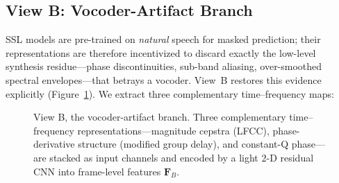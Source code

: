 \subsection{View B: Vocoder-Artifact Branch}
\label{ssec:viewb}

SSL models are pre-trained on \emph{natural} speech for masked prediction; their
representations are therefore incentivized to discard exactly the low-level synthesis
residue---phase discontinuities, sub-band aliasing, over-smoothed spectral
envelopes---that betrays a vocoder. View~B restores this evidence explicitly
(Figure~\ref{fig:artifact}). We extract three complementary time--frequency maps:

\begin{figure}[t]
\centering
{}
\caption{View B, the vocoder-artifact branch. Three complementary time--frequency
representations---magnitude cepstra (LFCC), phase-derivative structure (modified group
delay), and constant-Q phase---are stacked as input channels and encoded by a light 2-D
residual CNN into frame-level features $\mathbf{F}_B$.}
\label{fig:artifact}
\end{figure}

